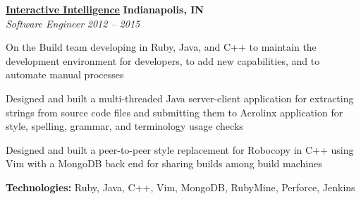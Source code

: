 %
    \headerrow
        {\textbf{\href{https://www.genesys.com/inin}{Interactive Intelligence}}}
        {\textbf{Indianapolis, IN}}
    \\
    \headerrow
        {\emph{Software Engineer}}
        {\emph{2012 -- 2015}}
    \begin{itemize*}
        \item On the Build team developing in Ruby, Java, and C++ to maintain the development environment for developers,
            to add new capabilities, and to automate manual processes
         \item Designed and built a multi-threaded Java server-client application for extracting strings from
                source code files and submitting them to Acrolinx application for style, spelling, grammar, and terminology
                usage checks
        \item Designed and built a peer-to-peer style replacement for Robocopy in C++ using Vim with a MongoDB back end
                for sharing builds among build machines
    \end{itemize*}

    \hspace{1.0em}
    \textbf{Technologies:} Ruby, Java, C++, Vim, MongoDB, RubyMine, Perforce, Jenkins

